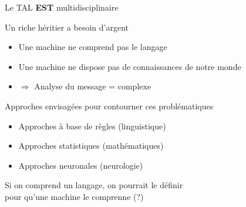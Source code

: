 \documentclass[serif, aspectratio=169]{beamer}
\begin{document}
\begin{frame}{Le TAL \textbf{EST} multidisciplinaire}
    \begin{block}{Un riche héritier a besoin d'argent}
        \pause
        \begin{itemize}
            \item Une machine ne comprend pas le langage
            \pause
            \item Une machine ne dispose pas de connaissances de notre monde
            \item $\Rightarrow$ Analyse du message = complexe
        \end{itemize}
    \end{block}
    \begin{block}{Approches envisagées pour contourner ces problématiques}
        \pause
        \begin{itemize}
            \item Approches à base de règles (linguistique)
            \pause
            \item Approches statistiques (mathématiques)
            \pause
            \item Approches neuronales (neurologie)
        \end{itemize}
    \end{block}
    \pause
    \begin{center}
        \Large
        Si on comprend un langage, on pourrait le définir \\ pour qu'une machine le comprenne (?)
    \end{center}
\end{frame}
\end{document}
